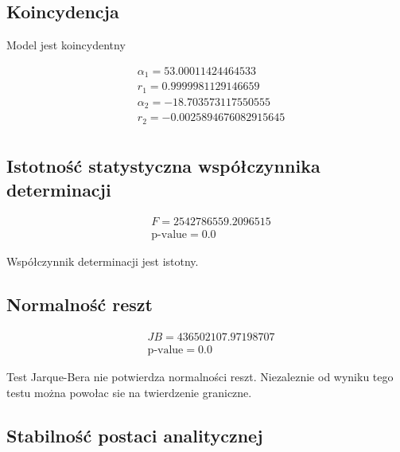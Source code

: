 \subsection{Koincydencja}\label{subsec:koincydencja}

Model jest koincydentny


\begin{equation}
    \begin{split}
        &\alpha_1= 53.00011424464533  \\ &r_1 = 0.9999981129146659  \\
        &\alpha_2= -18.703573117550555  \\ &r_2 = -0.0025894676082915645  \\
    \end{split}
\end{equation}

\subsection{Istotność statystyczna współczynnika determinacji}\label{subsec:istotnosc-statystyczna-wspolczynnika-determinacji}

\begin{equation}
    \begin{split}
        &F= 2542786559.2096515 \\  &\text{p-value} = 0.0
    \end{split}
\end{equation}

Współczynnik determinacji jest istotny.

\subsection{Normalność reszt}\label{subsec:normalnosc-reszt}

\begin{equation}
    \begin{split}
        &JB=436502107.97198707 \\ &\text{p-value} = 0.0
    \end{split}
\end{equation}

Test Jarque-Bera nie potwierdza normalności reszt.
Niezaleznie od wyniku tego testu można powołac sie na twierdzenie graniczne.

\subsection{Stabilność postaci analitycznej}\label{subsec:stabilnosc-postaci-analitycznej}


